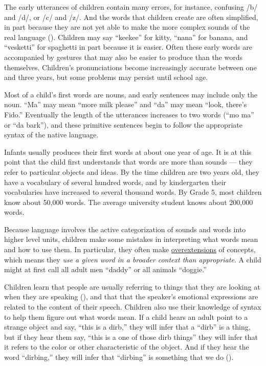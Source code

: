 \documentclass[
]{krantz}
\begin{document}
The early utterances of children contain many errors, for instance, confusing /b/ and /d/, or /c/ and /z/. And the words that children create are often simplified, in part because they are not yet able to make the more complex sounds of the real language (). Children may say ``keekee'' for kitty, ``nana'' for banana, and ``vesketti'' for spaghetti in part because it is easier. Often these early words are accompanied by gestures that may also be easier to produce than the words themselves. Children's pronunciations become increasingly accurate between one and three years, but some problems may persist until school age.

Most of a child's first words are nouns, and early sentences may include only the noun. ``Ma'' may mean ``more milk please'' and ``da'' may mean ``look, there's Fido.'' Eventually the length of the utterances increases to two words (``mo ma'' or ``da bark''), and these primitive sentences begin to follow the appropriate syntax of the native language.

Infants usually produces their first words at about one year of age. It is at this point that the child first understands that words are more than sounds --- they refer to particular objects and ideas. By the time children are two years old, they have a vocabulary of several hundred words, and by kindergarten their vocabularies have increased to several thousand words. By Grade 5, most children know about 50,000 words. The average university student knows about 200,000 words.

Because language involves the active categorization of sounds and words into higher level units, children make some mistakes in interpreting what words mean and how to use them. In particular, they often make \hyperref[overextensions]{overextensions} of concepts, which means they \emph{use a given word in a broader context than appropriate}. A child might at first call all adult men ``daddy'' or all animals ``doggie.''

Children learn that people are usually referring to things that they are looking at when they are speaking (), and that that the speaker's emotional expressions are related to the content of their speech. Children also use their knowledge of syntax to help them figure out what words mean. If a child hears an adult point to a strange object and say, ``this is a dirb,'' they will infer that a ``dirb'' is a thing, but if they hear them say, ``this is a one of those dirb things'' they will infer that it refers to the color or other characteristic of the object. And if they hear the word ``dirbing,'' they will infer that ``dirbing'' is something that we do ().
\end{document}
